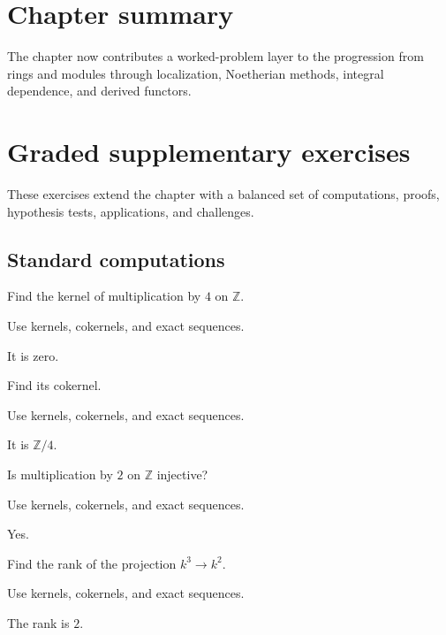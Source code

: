 \section*{Chapter summary}
The chapter now contributes a worked-problem layer to the progression from rings and modules through localization, Noetherian methods, integral dependence, and derived functors.
\section{Graded supplementary exercises}
These exercises extend the chapter with a balanced set of computations, proofs, hypothesis tests, applications, and challenges.

\subsection*{Standard computations}

\begin{exercise}[Kernel]\label{exr:v09-expand-01}
Find the kernel of multiplication by $4$ on $\mathbb Z$.
\end{exercise}
\begin{hint}
Use kernels, cokernels, and exact sequences.
\end{hint}
\begin{solution}
It is zero.
\end{solution}

\begin{exercise}[Cokernel]\label{exr:v09-expand-02}
Find its cokernel.
\end{exercise}
\begin{hint}
Use kernels, cokernels, and exact sequences.
\end{hint}
\begin{solution}
It is $\mathbb Z/4$.
\end{solution}

\begin{exercise}[Injection]\label{exr:v09-expand-03}
Is multiplication by $2$ on $\mathbb Z$ injective?
\end{exercise}
\begin{hint}
Use kernels, cokernels, and exact sequences.
\end{hint}
\begin{solution}
Yes.
\end{solution}

\begin{exercise}\label{exr:v09-expand-04}
Find the rank of the projection $k^3\to k^2$.
\end{exercise}
\begin{hint}
Use kernels, cokernels, and exact sequences.
\end{hint}
\begin{solution}
The rank is $2$.
\end{solution}

